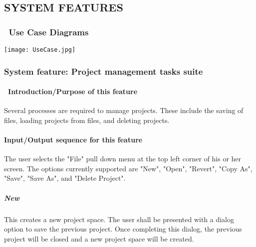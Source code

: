\documentclass[twoside,letterpaper]{article}
\begin{document}
\bigskip


\bigskip

\bigskip









\clearpage\setcounter{page}{1}\pagestyle{Convertv}
\subsection[SYSTEM FEATURES]{\rmfamily\bfseries\color{black}
SYSTEM FEATURES}


\subsubsection[\ Use Case Diagrams]{\foreignlanguage{english}{\ }\foreignlanguage{english}{Use
Case Diagrams}}
{\color{black}
\texttt{[image: UseCase.jpg]}
}

\subsubsection[System feature: [Project management tasks suite]{\rmfamily\bfseries\color{black} System
feature: Project management tasks suite}

\paragraph[\ Introduction/Purpose of this feature]{\foreignlanguage{english}{\ }\foreignlanguage{english}{Introduction/Purpose of this feature}}
{\color{black}
Several processes are required to manage projects. These include the saving of files, loading projects from files, and deleting projects.}


\paragraph[Input/Output sequence for this feature]{\rmfamily\bfseries\color{black}
Input/Output sequence for this feature}
{\color{black}
The user selects the "File" pull down menu at the top left corner of his or her screen. The options currently supported are "New", "Open", "Revert", "Copy As", "Save", "Save As", and "Delete Project". }

\subparagraph{New}
{\color{black}
This creates a new project space. The user shall be presented with a dialog option to save the previous project. Once completing this dialog, the previous project will be closed and a new project space will be created. }
\end{document}
